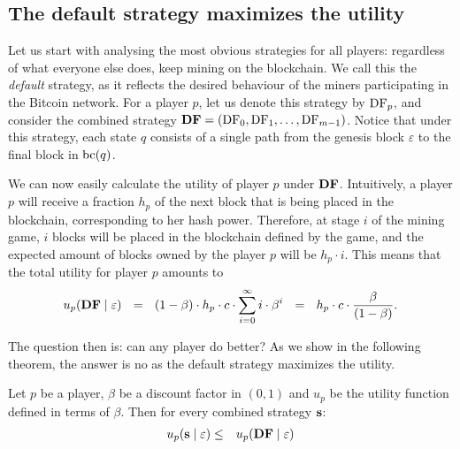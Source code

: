  \subsection{The default strategy maximizes the utility}

Let us start with analysing the most obvious strategies for all players: regardless of what everyone else does, keep mining on the blockchain. We call this 
the \emph{default} strategy, as it reflects the desired behaviour of the miners participating in the Bitcoin network. 
For a player $p$, let us denote this strategy 
by $\text{\rm DF}_p$, and consider the combined strategy $\text{\rm {\bf DF}} = (\text{\rm DF}_0,\text{\rm DF}_1,\dots,\text{\rm DF}_{m-1})$. Notice that under this strategy, each state $q$ consists of a single path from the genesis block $\varepsilon$ to the final block in $\text{bc}(q)$.

We can now easily calculate the utility of player $p$ under $\text{\rm {\bf DF}}$. Intuitively, a player $p$ will receive a fraction $h_p$ of the next block that is being placed in the blockchain, corresponding to her hash power. Therefore, at stage $i$ of the mining game, $i$ blocks will be placed in the blockchain defined by the game, and the expected amount of blocks owned by the player $p$ will be $h_p\cdot i$. This means that the total utility for player $p$ amounts to 
$$u_p(\text{\rm {\bf DF}} \mid \varepsilon) \ \ = \ \ (1 - \beta) \cdot h_p \cdot c\cdot \sum_{i=0}^{\infty}i \cdot \beta^{i} \ \ =  \ \ h_p\cdot c \cdot \frac{\beta}{(1-\beta)}.$$


The question then is: can any player do better? As we show in the following theorem, the answer is no as the default strategy maximizes the utility. 
\begin{mythm}\label{thm-conts_dom_str}
Let $p$ be a player, $\beta$ be a discount factor in $(0,1)$ and $u_p$ be the utility function defined in terms of $\beta$. Then for every combined strategy $\mathbf{s}$:
\begin{eqnarray*}
u_p(\mathbf{s} \mid \varepsilon) & \leq & u_p(\text{\rm {\bf DF}} \mid \varepsilon)
\end{eqnarray*}
\end{mythm} 


